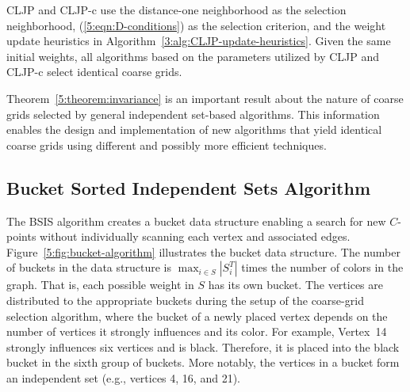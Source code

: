 \documentclass{elsart}
\begin{document}
\begin{rem}
CLJP and CLJP-c use the distance-one neighborhood as the selection
neighborhood, (\ref{5:eqn:D-conditions}) as the selection criterion,
and the weight update heuristics in
Algorithm~\ref{3:alg:CLJP-update-heuristics}. Given the same initial
weights, all algorithms based on the parameters utilized by CLJP and
CLJP-c select identical coarse grids.
\end{rem}

Theorem~\ref{5:theorem:invariance} is an important result about the
nature of coarse grids selected by general independent set-based
algorithms. This information enables the design and implementation of
new algorithms that yield identical coarse grids using different and
possibly more efficient techniques.

\subsection{Bucket Sorted Independent Sets Algorithm}
The BSIS algorithm creates a bucket data structure enabling a search
for new $C$-points without individually scanning each vertex and
associated edges. Figure~\ref{5:fig:bucket-algorithm} illustrates the
bucket data structure. The number of buckets in the data structure is
$\max_{i \in S}|S_i^T|$ times the number of colors in the graph. That
is, each possible weight in $S$ has its own bucket. The vertices are
distributed to the appropriate buckets during the setup of the
coarse-grid selection algorithm, where the bucket of a newly placed
vertex depends on the number of vertices it strongly influences and
its color. For example, Vertex~14 strongly influences six vertices and
is black. Therefore, it is placed into the black bucket in the sixth
group of buckets. More notably, the vertices in a bucket form an
independent set (e.g., vertices 4, 16, and 21).
\end{document}
